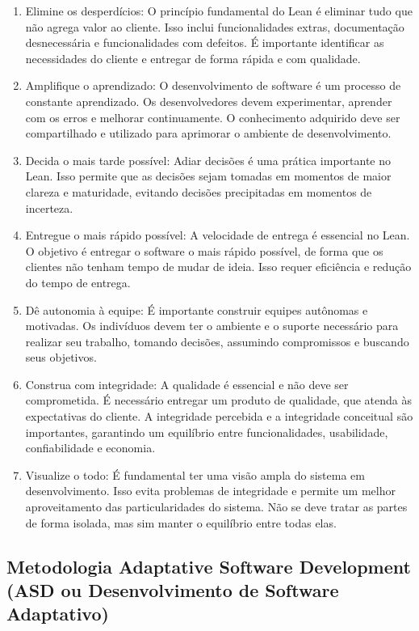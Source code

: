 \begin{enumerate}
	\item Elimine os desperdícios: O princípio fundamental do Lean é eliminar tudo que não agrega valor ao cliente. Isso inclui funcionalidades extras, documentação desnecessária e funcionalidades com defeitos. É importante identificar as necessidades do cliente e entregar de forma rápida e com qualidade.
	\item Amplifique o aprendizado: O desenvolvimento de software é um processo de constante aprendizado. Os desenvolvedores devem experimentar, aprender com os erros e melhorar continuamente. O conhecimento adquirido deve ser compartilhado e utilizado para aprimorar o ambiente de desenvolvimento.
	\item Decida o mais tarde possível: Adiar decisões é uma prática importante no Lean. Isso permite que as decisões sejam tomadas em momentos de maior clareza e maturidade, evitando decisões precipitadas em momentos de incerteza.
	\item Entregue o mais rápido possível: A velocidade de entrega é essencial no Lean. O objetivo é entregar o software o mais rápido possível, de forma que os clientes não tenham tempo de mudar de ideia. Isso requer eficiência e redução do tempo de entrega.
	\item Dê autonomia à equipe: É importante construir equipes autônomas e motivadas. Os indivíduos devem ter o ambiente e o suporte necessário para realizar seu trabalho, tomando decisões, assumindo compromissos e buscando seus objetivos.
	\item Construa com integridade: A qualidade é essencial e não deve ser comprometida. É necessário entregar um produto de qualidade, que atenda às expectativas do cliente. A integridade percebida e a integridade conceitual são importantes, garantindo um equilíbrio entre funcionalidades, usabilidade, confiabilidade e economia.
	\item Visualize o todo: É fundamental ter uma visão ampla do sistema em desenvolvimento. Isso evita problemas de integridade e permite um melhor aproveitamento das particularidades do sistema. Não se deve tratar as partes de forma isolada, mas sim manter o equilíbrio entre todas elas.
\end{enumerate}

\subsection{Metodologia Adaptative Software Development (ASD ou Desenvolvimento de Software Adaptativo)}

